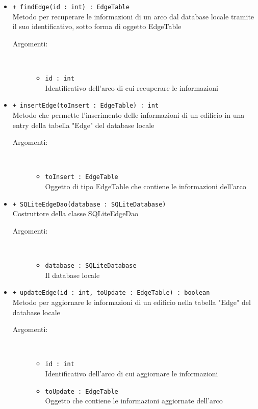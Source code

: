 \documentclass[../DefinizioneDiProdotto.tex]{subfiles}
\begin{document}
\begin{description}
\begin{itemize}
\begin{description}
\end{description}
\item \texttt{+ findEdge(id : int) : EdgeTable}\\
Metodo per recuperare le informazioni di un arco dal database locale tramite il suo identificativo, sotto forma di oggetto EdgeTable
 \begin{description}
\item[Argomenti:] \
\begin{itemize}
\item \texttt{id : int}\\
Identificativo dell'arco di cui recuperare le informazioni\end{itemize}
\end{description}
\item \texttt{+ insertEdge(toInsert : EdgeTable) : int}\\
Metodo che permette l'inserimento delle informazioni di un edificio in una entry della tabella "Edge" del database locale
 \begin{description}
\item[Argomenti:] \
\begin{itemize}
\item \texttt{toInsert : EdgeTable}\\
Oggetto di tipo EdgeTable che contiene le informazioni dell'arco\end{itemize}
\end{description}
\item \texttt{+ SQLiteEdgeDao(database : SQLiteDatabase)}\\
Costruttore della classe SQLiteEdgeDao
 \begin{description}
\item[Argomenti:] \
\begin{itemize}
\item \texttt{database : SQLiteDatabase}\\
Il database locale\end{itemize}
\end{description}
\item \texttt{+ updateEdge(id : int, toUpdate : EdgeTable) : boolean}\\
Metodo per aggiornare le informazioni di un edificio nella tabella "Edge" del database locale
 \begin{description}
\item[Argomenti:] \
\begin{itemize}
\item \texttt{id : int}\\
Identificativo dell'arco di cui aggiornare le informazioni\item \texttt{toUpdate : EdgeTable}\\
Oggetto che contiene le informazioni aggiornate dell'arco\end{itemize}
\end{description}
\end{itemize}
\end{description}
\end{document}
